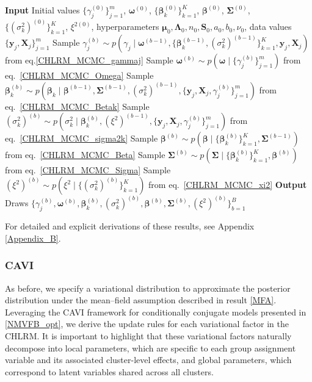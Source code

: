 \begin{algorithm}[H]
\caption{Gibbs Sampling for CHLRM}
\begin{algorithmic}
\State \textbf{Input} Initial values $\{\gamma_j^{(0)}\}_{j=1}^m$, $\bm{\omega}^{(0)}$, $\{\bm{\beta}_k^{(0)}\}_{k=1}^K$, $\bm{\beta}^{(0)}$, $\bm{\Sigma}^{(0)}$, $\{(\sigma_k^2)^{(0)}\}_{k=1}^K$, $\xi^{2(0)}$, hyperparameters $\bm{\mu}_0, \bm{\Lambda}_0, n_0, \bm{S}_0, a_0, b_0, \nu_0$, data values $\{\bm{y}_j,\bm{X}_j\}_{j=1}^m$
    \State Sample $\gamma_j^{(b)} \sim p\!\left(\gamma_j \mid \bm{\omega}^{(b-1)}, \{\bm{\beta}_k^{(b-1)}, (\sigma_k^2)^{(b-1)}\}_{k=1}^K, \bm{y}_j, \bm{X}_j \right)$ from eq.\ref{CHLRM_MCMC_gammaj}
  \EndFor
  \State Sample $\bm{\omega}^{(b)} \sim p\!\left(\bm{\omega} \mid \{\gamma_j^{(b)}\}_{j=1}^m \right)$ from eq.~\ref{CHLRM_MCMC_Omega}
    \State Sample $\bm{\beta}_k^{(b)} \sim p\!\left(\bm{\beta}_k \mid \bm{\beta}^{(b-1)}, \bm{\Sigma}^{(b-1)}, (\sigma_k^2)^{(b-1)}, \{\bm{y}_j, \bm{X}_j, \gamma_j^{(b)}\}_{j=1}^m \right)$ from eq.~\ref{CHLRM_MCMC_Betak}
    \State Sample $(\sigma_k^2)^{(b)} \sim p\!\left(\sigma_k^2 \mid \bm{\beta}_k^{(b)}, (\xi^2)^{(b-1)}, \{\bm{y}_j, \bm{X}_j, \gamma_j^{(b)}\}_{j=1}^m \right)$ from eq.~\ref{CHLRM_MCMC_sigma2k}
  \EndFor
  \State Sample $\bm{\beta}^{(b)} \sim p\!\left(\bm{\beta} \mid \{\bm{\beta}_k^{(b)}\}_{k=1}^K, \bm{\Sigma}^{(b-1)} \right)$ from eq.~\ref{CHLRM_MCMC_Beta}
  \State Sample $\bm{\Sigma}^{(b)} \sim p\!\left(\bm{\Sigma} \mid \{\bm{\beta}_k^{(b)}\}_{k=1}^K, \bm{\beta}^{(b)} \right)$ from eq.~\ref{CHLRM_MCMC_Sigma}
  \State Sample $(\xi^2)^{(b)} \sim p\!\left(\xi^2 \mid \{(\sigma_k^2)^{(b)}\}_{k=1}^K \right)$ from eq.~\ref{CHLRM_MCMC_xi2}
\EndFor
\State \textbf{Output} Draws $\{\gamma_j^{(b)},\bm{\omega}^{(b)},\bm{\beta}_k^{(b)},(\sigma_k^2)^{(b)},\bm{\beta}^{(b)},\bm{\Sigma}^{(b)},(\xi^2)^{(b)}\}_{b=1}^B$
\end{algorithmic}
\end{algorithm}


For detailed and explicit derivations of these results, see Appendix \ref{Appendix_B}.

\subsubsection{CAVI}

As before, we specify a variational distribution to approximate the posterior distribution under the mean--field assumption described in result \ref{MFA}. Leveraging the CAVI framework for conditionally conjugate models presented in \ref{NMVFB_opt}, we derive the update rules for each variational factor in the CHLRM. It is important to highlight that these variational factors naturally decompose into local parameters, which are specific to each group assignment variable and its associated cluster-level effects, and global parameters, which correspond to latent variables shared across all clusters.

